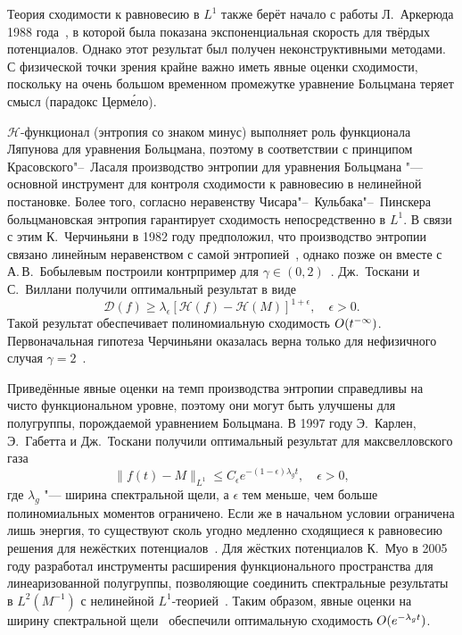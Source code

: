 Теория сходимости к равновесию в \(L^1\) также берёт начало с работы Л.~Аркерюда 1988 года~\cite{Arkeryd1988},
в которой была показана экспоненциальная скорость для твёрдых потенциалов.
Однако этот результат был получен неконструктивными методами.
С физической точки зрения крайне важно иметь явные оценки сходимости, поскольку на очень большом временном промежутке
уравнение Больцмана теряет смысл (парадокс Церм\'{е}ло).

\(\mathcal{H}\)-функционал (энтропия со знаком минус) выполняет роль функционала Ляпунова для уравнения Больцмана,
поэтому в соответствии с принципом Красовского"--~Ласаля производство энтропии для уравнения Больцмана
"--- основной инструмент для контроля сходимости к равновесию в нелинейной постановке.
Более того, согласно неравенству Чисара"--~Кульбака"--~Пинскера больцмановская энтропия
гарантирует сходимость непосредственно в \(L^1\).
В связи с этим К.~Черчиньяни в 1982 году предположил, что производство энтропии связано
линейным неравенством с самой энтропией~\cite{Cercignani1982, Desvillettes2011},
однако позже он вместе с А.\,В.~Бобылевым построили контрпример для \(\gamma\in(0,2)\)~\cite{Bobylev1999}.
Дж.~Тоскани и С.~Виллани получили оптимальный результат в виде~\cite{Toscani1999, Toscani2000, Villani2003}
\begin{equation*}
    \mathcal{D}(f) \geq \lambda_\epsilon \left[ \mathcal{H}(f) - \mathcal{H}(M) \right]^{1+\epsilon},
    \quad \epsilon > 0.
\end{equation*}
Такой результат обеспечивает полиномиальную сходимость \(O(t^{-\infty})\).
Первоначальная гипотеза Черчиньяни оказалась верна только для нефизичного случая \(\gamma=2\)~\cite{Villani2003}.

Приведённые явные оценки на темп производства энтропии справедливы на чисто функциональном уровне,
поэтому они могут быть улучшены для полугруппы, порождаемой уравнением Больцмана.
В 1997 году Э.~Карлен, Э.~Габетта и Дж.~Тоскани получили оптимальный результат для максвелловского газа~\cite{Carlen1999}
\begin{equation*}
    \|f(t) - M\|_{L^1} \leq C_\epsilon e^{-(1-\epsilon)\lambda_g t}, \quad \epsilon > 0,
\end{equation*}
где \(\lambda_g\) "--- ширина спектральной щели, а \(\epsilon\) тем меньше,
чем больше полиномиальных моментов ограничено.
Если же в начальном условии ограничена лишь энергия, то существуют сколь угодно медленно сходящиеся к равновесию
решения для нежёстких потенциалов~\cite{Carlen2003, Carlen2009}.
Для жёстких потенциалов К.~Муо в 2005 году разработал инструменты расширения функционального пространства для линеаризованной полугруппы,
позволяющие соединить спектральные результаты в \(L^2(M^{-1})\) с нелинейной \(L^1\)-теорией~\cite{Mouhot2006}.
Таким образом, явные оценки на ширину спектральной щели~\cite{Baranger2005}
обеспечили оптимальную сходимость \(O(e^{-\lambda_g t})\).

